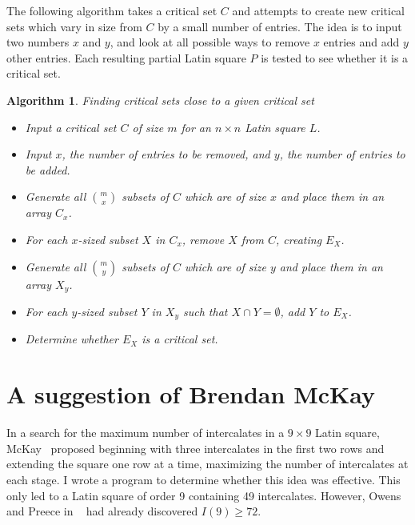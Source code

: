 \documentclass[12pt]{report}
\newtheorem{algorithm}{Algorithm}
\begin{document}
The following algorithm takes a critical set $C$ and attempts to create
new critical sets which vary in size from $C$ by a small number of entries.
The idea is to input two numbers $x$ and $y$, and look at all
possible ways to remove $x$ entries and add $y$ other entries.  Each
resulting partial Latin square $P$ is tested to see whether it is a critical set.

\begin{algorithm}{Finding critical sets close to a given critical set}
\begin{itemize}
\item Input a critical set $C$ of size $m$ for an $n \times n$ Latin square $L$.
\item Input $x$, the number of entries to be removed, and $y$, the
number of entries to be added.
\item Generate all $\displaystyle{\binom{m}{x}}$ subsets of $C$ which are of size $x$ and
place them in an array $C_x$.
\item For each $x$-sized subset $X$ in $C_x$, remove $X$ from $C$, creating $E_X$.
\item Generate all $\displaystyle{\binom{m}{y}}$ subsets of $C$ which are of size $y$ and place them in an array $X_y$.
\item For each $y$-sized subset $Y$ in $X_y$ such that $X \cap Y = \emptyset$, add $Y$ to $E_X$.
\item Determine whether $E_X$ is a critical set.
\end{itemize}
\end{algorithm}

\section{A suggestion of Brendan McKay}
In a search for the maximum number of intercalates in a $9 \times 9$ Latin
square, McKay~\cite{mck} proposed beginning with three intercalates
in the first two rows and extending the square one row at a time,
maximizing the number of intercalates at each stage.  I wrote a program
to determine whether this idea was effective.  This only led to a Latin square
of order 9 containing 49 intercalates.  However, Owens and Preece in
~\cite{MR96g:05029} had already discovered $I(9) \geq 72$.
\end{document}
